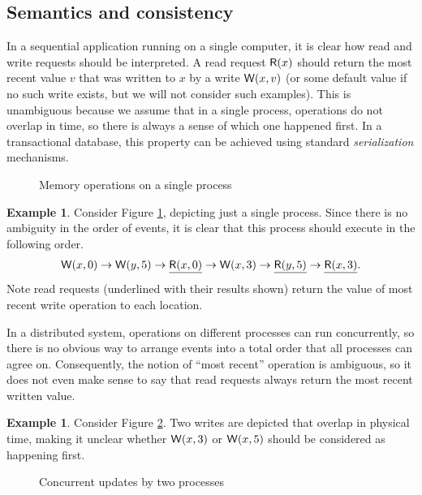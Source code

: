 \documentclass[]             %
{NASA}                       %
\theoremstyle{definition}
\newtheorem{example}[theorem]{Example}
\begin{document}
\subsection{Semantics and consistency}
In a sequential application running on a single computer, it is clear
how read and write requests should be interpreted. A read request
$\mathsf{R}\!\left(x\right)$ should return the most recent value $v$ that was written
to $x$ by a write $\mathsf{W}\!\left(x, v\right)$ (or some default value if no such
write exists, but we will not consider such examples). This is
unambiguous because we assume that in a single process, operations do
not overlap in time, so there is always a sense of which one happened
first. In a transactional database, this property can be achieved
using standard \emph{serialization} mechanisms.
\begin{figure}
  
  \caption{Memory operations on a single process}
  \label{fig:smEx0}
\end{figure}

\begin{example}
  \label{exmpl:updatesoneprocess}
  Consider Figure \ref{fig:smEx0}, depicting just a single
  process. Since there is no ambiguity in the order of events, it is
  clear that this process should execute in the following order.
  \[ \mathsf{W}\!\left(x, 0\right) \to \mathsf{W}\!\left(y, 5\right) \to \underline{\mathsf{R}\!\left(x, 0\right)} \to \mathsf{W}\!\left(x, 3\right) \to \underline{\mathsf{R}\!\left(y, 5\right)} \to \underline{\mathsf{R}\!\left(x, 3\right)}. \]
  Note read requests (underlined with their results shown) return the value of most recent write operation to each location.
\end{example}

In a distributed system, operations on different processes can run
concurrently, so there is no obvious way to arrange events into a
total order that all processes can agree on. Consequently, the notion
of ``most recent'' operation is ambiguous, so it does not even make
sense to say that read requests always return the most recent written
value.

\begin{example}
  \label{exmpl:concurrentupdates}
  Consider Figure \ref{fig:smEx2}. Two writes are depicted that overlap
  in physical time, making it unclear whether $\mathsf{W}\!\left(x, 3\right)$ or $\mathsf{W}\!\left(x, 5\right)$
  should be considered as happening first.
\end{example}

\begin{figure}
  
  \caption{Concurrent updates by two processes}
  \label{fig:smEx2}
\end{figure}
\end{document}
